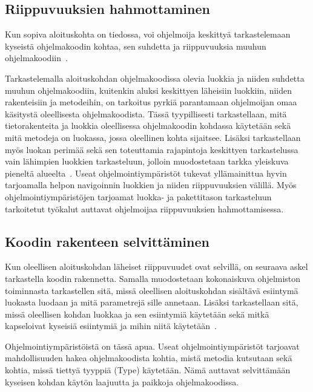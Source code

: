 \documentclass[finnish]{tktltiki2}
\theoremstyle{definition}
\theoremstyle{remark}
\begin{document}
\subsection{Riippuvuuksien hahmottaminen}
Kun sopiva aloituskohta on tiedossa, voi ohjelmoija keskittyä tarkastelemaan kyseistä ohjelmakoodin kohtaa, sen suhdetta ja riippuvuuksia muuhun ohjelmakoodiin~\cite{questions-during-software-evolution-tasks}.

Tarkastelemalla aloituskohdan ohjelmakoodissa olevia luokkia ja niiden suhdetta muuhun ohjelmakoodiin, kuitenkin aluksi keskittyen läheisiin luokkiin, niiden rakenteisiin ja metodeihin, on tarkoitus pyrkiä parantamaan ohjelmoijan omaa käsitystä oleellisesta ohjelmakoodista. Tässä tyypillisesti tarkastellaan, mitä tietorakenteita ja luokkia oleellisessa ohjelmakoodin kohdassa käytetään sekä mitä metodeja on luokassa, jossa oleellinen kohta sijaitsee. Lisäksi tarkastellaan myös luokan perimää sekä sen toteuttamia rajapintoja keskittyen tarkastelussa vain lähimpien luokkien tarkasteluun, jolloin muodostetaan tarkka yleiskuva pieneltä alueelta~\cite{questions-during-software-evolution-tasks,questions-during-software-evolution-tasks}.
Useat ohjelmointiympäristöt tukevat yllämainittua hyvin tarjoamalla helpon navigoinnin luokkien ja niiden riippuvuuksien välillä. Myös ohjelmointiympäristöjen tarjoamat luokka- ja pakettitason tarkasteluun tarkoitetut työkalut auttavat ohjelmoijaa riippuvuuksien hahmottamisessa.

\subsection{Koodin rakenteen selvittäminen}
Kun oleellisen aloituskohdan läheiset riippuvuudet ovat selvillä, on seuraava askel tarkastella koodin rakennetta. Samalla muodostetaan kokonaiskuva ohjelmiston toiminnasta tarkastellen sitä, missä oleellisen aloituskohdan sisältävä esiintymä luokasta luodaan ja mitä parametrejä sille annetaan. Lisäksi tarkastellaan sitä, missä oleellisen kohdan luokkaa ja sen esiintymiä käytetään sekä mitkä kapseloivat kyseisiä esiintymiä ja mihin niitä käytetään~\cite{questions-during-software-evolution-tasks}.

Ohjelmointiympäristöistä on tässä apua. Useat ohjelmointiympäristöt tarjoavat mahdollisuuden hakea ohjelmakoodista kohtia, mistä metodia kutsutaan sekä kohtia, missä tiettyä tyyppiä (Type) käytetään. Nämä auttavat selvittämään kyseisen kohdan käytön laajuutta ja paikkoja ohjelmakoodissa.

\end{document}
